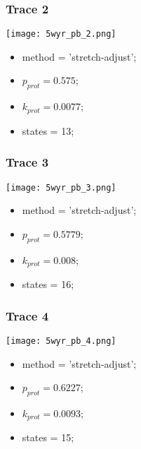 \subsubsection{Trace 2}
\begin{minipage}[c]{0.7\textwidth}
    \texttt{[image: 5wyr\_pb\_2.png]}
\end{minipage}
\hfill
\begin{minipage}[c]{0.45\textwidth}
    \begin{itemize}
        \item method = 'stretch-adjust';
        \item $p_{prot}=0.575$;
        \item $k_{prot}=0.0077$;
        \item states = 13;
    \end{itemize}
\end{minipage}

\subsubsection{Trace 3}
\begin{minipage}[c]{0.7\textwidth}
    \texttt{[image: 5wyr\_pb\_3.png]}
\end{minipage}
\hfill
\begin{minipage}[c]{0.45\textwidth}
    \begin{itemize}
        \item method = 'stretch-adjust';
        \item $p_{prot}=0.5779$;
        \item $k_{prot}=0.008$;
        \item states = 16;
    \end{itemize}
\end{minipage}

\subsubsection{Trace 4}
\begin{minipage}[c]{0.7\textwidth}
    \texttt{[image: 5wyr\_pb\_4.png]}
\end{minipage}
\hfill
\begin{minipage}[c]{0.45\textwidth}
    \begin{itemize}
        \item method = 'stretch-adjust';
        \item $p_{prot}=0.6227$;
        \item $k_{prot}=0.0093$;
        \item states = 15;
    \end{itemize}
\end{minipage}

